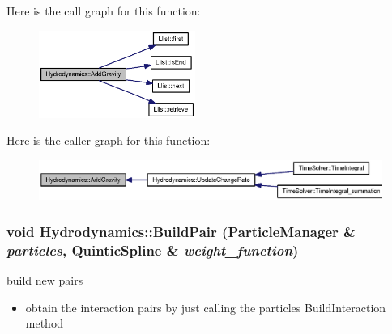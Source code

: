 Here is the call graph for this function:\nopagebreak
\begin{figure}[H]
\begin{center}
\leavevmode
\includegraphics[width=145pt]{classHydrodynamics_abdebac769f07f2500c21689fafa2981_cgraph}
\end{center}
\end{figure}


Here is the caller graph for this function:\nopagebreak
\begin{figure}[H]
\begin{center}
\leavevmode
\includegraphics[width=339pt]{classHydrodynamics_abdebac769f07f2500c21689fafa2981_icgraph}
\end{center}
\end{figure}
\hypertarget{classHydrodynamics_41e1527e65d6f93d81c30467871021f5}{
\subsubsection[{BuildPair}]{\setlength{\rightskip}{0pt plus 5cm}void Hydrodynamics::BuildPair ({\bf ParticleManager} \& {\em particles}, \/  {\bf QuinticSpline} \& {\em weight\_\-function})}}
\label{classHydrodynamics_41e1527e65d6f93d81c30467871021f5}


build new pairs 



\begin{itemize}
\item obtain the interaction pairs by just calling the particles BuildInteraction method \end{itemize}


